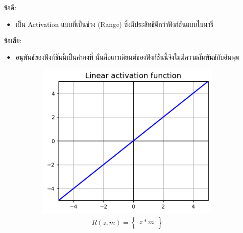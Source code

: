 \noindent ข้อดี:
\begin{itemize}[topsep=0pt,noitemsep]\setlength\itemsep{0.5em}
  \item เป็น Activation แบบที่เป็นช่วง (Range) ซึ่งมีประสิทธิดีกว่าฟังก์ชันแบบไบนารี่
\end{itemize}
%
ข้อเสีย:
\begin{itemize}[topsep=0pt,noitemsep]\setlength\itemsep{0.5em}
  \item อนุพันธ์ของฟังก์ชันนี้เป็นค่าคงที่ นั่นคือเกรเดียนต์ของฟังก์ชันนี้จึงไม่มีความสัมพันธ์กับอินพุต
\end{itemize}
%
\begin{figure}[H]
  \centering
  \begin{subfigure}{0.5\textwidth}
      \centering
      \includegraphics[width=0.9\linewidth]{fig/actfunc_linear.png}
      \caption{%
          \begin{equation}
              \begin{split}R(z,m) =
                  \begin{Bmatrix}
                      z*m \\
                  \end{Bmatrix}
              \end{split}
          \end{equation}
      }
      \label{fig:actfunc_lin}
  \end{subfigure}%
  \begin{subfigure}{0.5\textwidth}
      \centering

\end{subfigure}
\end{figure}
